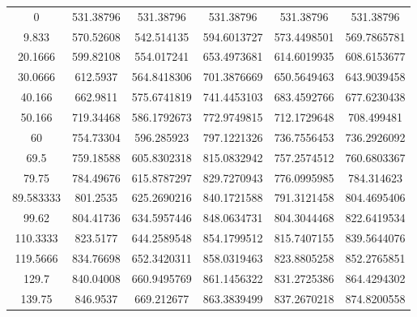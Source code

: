 \documentclass[\mainfilename]{subfiles}
\begin{document}
\begin{center}
\begin{tabular}{C*{5}{C}}
          \num{0} & \num{531.38796} & \num{531.38796} & \num{531.38796} & \num{531.38796} & \num{531.38796} 
        \\\num{9.833} & \num{570.52608} & \num{542.514135} & \num{594.6013727} & \num{573.4498501} & \num{569.7865781} 
        \\\num{20.1666} & \num{599.82108} & \num{554.017241} & \num{653.4973681} & \num{614.6019935} & \num{608.6153677} 
        \\\num{30.0666} & \num{612.5937} & \num{564.8418306} & \num{701.3876669} & \num{650.5649463} & \num{643.9039458} 
        \\\num{40.166} & \num{662.9811} & \num{575.6741819} & \num{741.4453103} & \num{683.4592766} & \num{677.6230438} 
        \\\num{50.166} & \num{719.34468} & \num{586.1792673} & \num{772.9749815} & \num{712.1729648} & \num{708.499481} 
        \\\num{60} & \num{754.73304} & \num{596.285923} & \num{797.1221326} & \num{736.7556453} & \num{736.2926092} 
        \\\num{69.5} & \num{759.18588} & \num{605.8302318} & \num{815.0832942} & \num{757.2574512} & \num{760.6803367} 
        \\\num{79.75} & \num{784.49676} & \num{615.8787297} & \num{829.7270943} & \num{776.0995985} & \num{784.314623} 
        \\\num{89.583333} & \num{801.2535} & \num{625.2690216} & \num{840.1721588} & \num{791.3121458} & \num{804.4695406} 
        \\\num{99.62} & \num{804.41736} & \num{634.5957446} & \num{848.0634731} & \num{804.3044468} & \num{822.6419534} 
        \\\num{110.3333} & \num{823.5177} & \num{644.2589548} & \num{854.1799512} & \num{815.7407155} & \num{839.5644076} 
        \\\num{119.5666} & \num{834.76698} & \num{652.3420311} & \num{858.0319463} & \num{823.8805258} & \num{852.2765851} 
        \\\num{129.7} & \num{840.04008} & \num{660.9495769} & \num{861.1456322} & \num{831.2725386} & \num{864.4294302} 
        \\\num{139.75} & \num{846.9537} & \num{669.212677} & \num{863.3839499} & \num{837.2670218} & \num{874.8200558} 

        \\\bottomrule
    \end{tabular}\\\vspace{1ex}
    \vspace{2ex}
\end{center}
    
\end{document}
